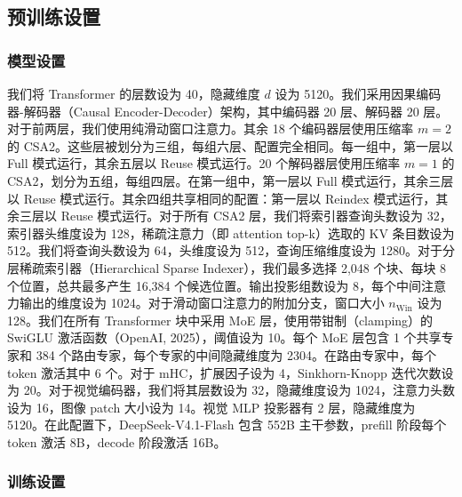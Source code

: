 \documentclass[
  10
]{article}
\begin{document}
\subsection{预训练设置}\label{pre-training-setups}

\subsubsection{模型设置}\label{model-setups}

我们将 Transformer 的层数设为 40，隐藏维度 $d$ 设为 5120。我们采用因果编码器-解码器（Causal Encoder-Decoder）架构，其中编码器 20 层、解码器 20 层。对于前两层，我们使用纯滑动窗口注意力。其余 18 个编码器层使用压缩率 \(m = 2\) 的 CSA2。这些层被划分为三组，每组六层、配置完全相同。每一组中，第一层以 Full 模式运行，其余五层以 Reuse 模式运行。20 个解码器层使用压缩率 \(m = 1\) 的 CSA2，划分为五组，每组四层。在第一组中，第一层以 Full 模式运行，其余三层以 Reuse 模式运行。其余四组共享相同的配置：第一层以 Reindex 模式运行，其余三层以 Reuse 模式运行。对于所有 CSA2 层，我们将索引器查询头数设为 32，索引器头维度设为 128，稀疏注意力（即 attention top-k）选取的 KV 条目数设为 512。我们将查询头数设为 64，头维度设为 512，查询压缩维度设为 1280。对于分层稀疏索引器（Hierarchical Sparse Indexer），我们最多选择 2,048 个块、每块 8 个位置，总共最多产生 16,384 个候选位置。输出投影组数设为 8，每个中间注意力输出的维度设为 1024。对于滑动窗口注意力的附加分支，窗口大小 \(n _ { \mathrm { W i n } }\) 设为 128。我们在所有 Transformer 块中采用 MoE 层，使用带钳制（clamping）的 SwiGLU 激活函数（OpenAI, 2025），阈值设为 10。每个 MoE 层包含 1 个共享专家和 384 个路由专家，每个专家的中间隐藏维度为 2304。在路由专家中，每个 token 激活其中 6 个。对于 mHC，扩展因子设为 4，Sinkhorn-Knopp 迭代次数设为 20。对于视觉编码器，我们将其层数设为 32，隐藏维度设为 1024，注意力头数设为 16，图像 patch 大小设为 14。视觉 MLP 投影器有 2 层，隐藏维度为 5120。在此配置下，DeepSeek-V4.1-Flash 包含 552B 主干参数，prefill 阶段每个 token 激活 8B，decode 阶段激活 16B。



\subsubsection{训练设置}\label{training-setups}
\end{document}

